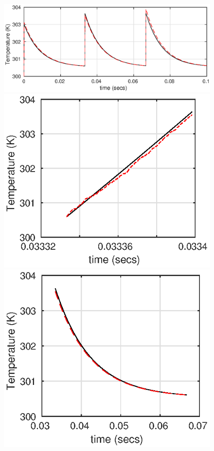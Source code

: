 \begin{figure}
\includegraphics[scale=0.9]{gfx/sol_several_pulses_noise.eps}
\includegraphics[scale=0.9]{gfx/sol_int_time_noise.eps}
\includegraphics[scale=0.9]{gfx/sol_cooling_noise.eps}

\end{figure}

